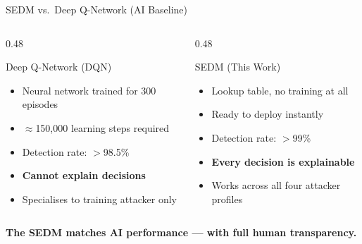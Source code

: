 \documentclass[aspectratio=169, 12pt]{beamer}
\begin{document}
\begin{frame}{SEDM vs.\ Deep Q-Network (AI Baseline)}
  \begin{columns}[T]
    \begin{column}{0.48\textwidth}
      \begin{block}{Deep Q-Network (DQN)}
        \begin{itemize}
          \item Neural network trained for 300 episodes
          \item $\approx$150,000 learning steps required
          \item Detection rate: $>$98.5\%
          \item \textcolor{alertred}{\textbf{Cannot explain decisions}}
          \item Specialises to training attacker only
        \end{itemize}
      \end{block}
    \end{column}
    \begin{column}{0.48\textwidth}
      \begin{exampleblock}{SEDM (This Work)}
        \begin{itemize}
          \item Lookup table, no training at all
          \item Ready to deploy instantly
          \item Detection rate: $>$99\%
          \item \textcolor{safegreen}{\textbf{Every decision is explainable}}
          \item Works across all four attacker profiles
        \end{itemize}
      \end{exampleblock}
    \end{column}
  \end{columns}
  \vspace{0.4cm}
  \begin{center}
    \large\textcolor{honeyblue}{\textbf{The SEDM matches AI performance — with full human transparency.}}
  \end{center}
\end{frame}
\end{document}
